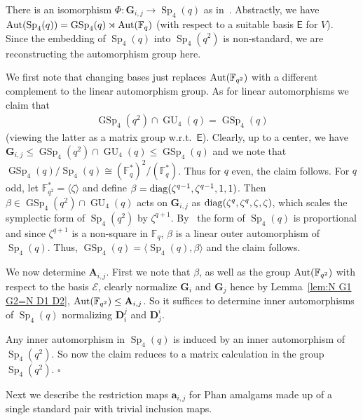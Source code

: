 \documentclass[12pt]{amsart}
\theoremstyle{definition}
\newcommand{\epf}{\qed}
\newcommand{\cE}{{\mathcal E}}
\newcommand{\sfE}{\mathsf E}
\newcommand{\Aut}{\mathop{\rm Aut}\nolimits}
\newcommand{\diag}{\mathop{\rm diag}\nolimits}
\newcommand{\FF}{{\mathbb F}}
\DeclareMathOperator{\Sp}{Sp}
\DeclareMathOperator{\GU}{GU}
\DeclareMathOperator{\GSp}{GSp}
\renewcommand{\qed}{\hfill $\square$}
\newcommand{\amgrpA}{{\mathbf{A}}}
\newcommand{\amgrpD}{{\mathbf{D}}}
\newcommand{\amgrpG}{{\mathbf{G}}}
\newcommand{\ama}{{\mathbf a}}
\begin{document}
There is an isomorphism $\Phi\colon \amgrpG_{i,j}\to \Sp_4(q)$ as in~\cite{GraHofShp2003}.
Abstractly, we have  $\Aut(\Sp_4(q))= \GSp_4(q)\rtimes\Aut(\FF_q)$ (with respect to a suitable basis $\sfE$ for $V$).
Since the embedding of $\Sp_4(q)$ into $\Sp_4(q^2)$ is non-standard, we are reconstructing the automorphism group here.

We first note that changing bases just replaces $\Aut(\FF_{q^2})$ with a different complement to the linear automorphism group.
As for linear automorphisms we claim that 
\begin{align*}
\GSp_4(q^2)\cap \GU_4(q)=\GSp_4(q)
\end{align*}
 (viewing the latter as a matrix group w.r.t.~$\sfE$).
Clearly, up to a center, we have  $\amgrpG_{i,j}\le \GSp_4(q^2)\cap \GU_4(q)\le \GSp_4(q)$ and we note that 
 $\GSp_4(q)/\Sp_4(q)\cong (\FF_q^*)^2/ (\FF_q^*)$.
Thus for $q$ even, the claim follows.
For $q$ odd, let $\FF_{q^2}^*=\langle \zeta\rangle$ and define  $\beta=\diag(\zeta^{q-1},\zeta^{q-1},1,1)$.
Then $\beta\in \GSp_4(q^2)\cap \GU_4(q)$ acts  
 on $\amgrpG_{i,j}$ as $\diag(\zeta^q,\zeta^q,\zeta,\zeta)$, which scales the symplectic form of $\Sp_4(q^2)$ by $\zeta^{q+1}$.
By~\cite{GraHofShp2003} the form of $\Sp_4(q)$ is proportional and since $\zeta^{q+1}$ is a non-square in $\FF_q$,  $\beta$ is a linear outer automorphism of $\Sp_4(q)$.  Thus, $\GSp_4(q)=\langle \Sp_4(q),\beta\rangle$ and the claim follows.

We now determine $\amgrpA_{i,j}$.
First we note that $\beta$, as well as the group $\Aut(\FF_{q^2})$ with respect to the basis $\cE$, clearly normalize $\amgrpG_i$ and $\amgrpG_j$ hence by Lemma~\ref{lem:N G1 G2=N D1 D2}, $\Aut(\FF_{q^2})\le \amgrpA_{i,j}$. So it suffices to determine inner automorphisms of $\Sp_4(q)$ normalizing $\amgrpD_i^j$ and $\amgrpD_j^i$.



Any inner automorphism in $\Sp_4(q)$ is induced by an inner automorphism of $\Sp_4(q^2)$.
So now the claim reduces to a matrix calculation in the group $\Sp_4(q^2)$.
\epf

\medskip

Next we describe the restriction maps $\ama_{i,j}$ for Phan amalgams made up of a single standard pair with trivial inclusion maps.
\end{document}

